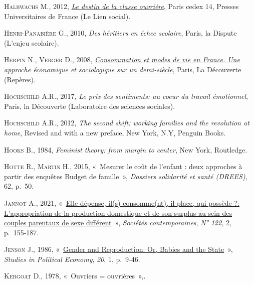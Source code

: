 \documentclass[
  12pt,
]{book}
\newlength{\cslhangindent}
\newenvironment{CSLReferences}[2] %
 {\begin{list}{}{%
  \setlength{\itemindent}{0pt}
  \setlength{\leftmargin}{0pt}
  \setlength{\parsep}{0pt}
  \ifodd #1
   \setlength{\leftmargin}{\cslhangindent}
   \setlength{\itemindent}{-1\cslhangindent}
  \fi
  \setlength{\itemsep}{#2\baselineskip}}}
 {\end{list}}
\begin{document}
\begin{CSLReferences}{0}{1}
\textsc{Halbwachs M.}, 2012,
\emph{\href{https://www.cairn.info/le-destin-de-la-classe-ouvriere--9782130585909.htm}{Le
destin de la classe ouvrière}}, Paris cedex 14, Presses Universitaires
de France (Le Lien social).

\textsc{Henri-Panabière G.}, 2010, \emph{Des héritiers en échec
scolaire}, Paris, la Dispute (L'enjeu scolaire).

\textsc{Herpin N.}, \textsc{Verger D.}, 2008,
\emph{\href{https://www.cairn.info/consommation-et-modes-de-vie-en-france--9782707156655.htm}{Consommation
et modes de vie en France. Une approche économique et sociologique sur
un demi-siècle}}, Paris, La Découverte (Repères).

\textsc{Hochschild A.R.}, 2017, \emph{Le prix des sentiments: au coeur
du travail émotionnel}, Paris, la Découverte (Laboratoire des sciences
sociales).

\textsc{Hochschild A.R.}, 2012, \emph{The second shift: working families
and the revolution at home}, Revised and with a new preface, New York,
N.Y, Penguin Books.

\textsc{Hooks B.}, 1984, \emph{Feminist theory: from margin to center},
New York, Routledge.

\textsc{Hotte R.}, \textsc{Martin H.}, 2015, {«~Mesurer le coût de
l{'}enfant : deux approches à partir des enquêtes Budget de famille~»},
\emph{Dossiers solidarité et santé (DREES)}, 62, p.~50.

\textsc{Jannot A.}, 2021,
{«~\href{https://doi.org/10.3917/soco.122.0155}{Elle dépense, il(s)
consomme(nt), il place, qui possède ?: L'appropriation de la production
domestique et de son surplus au sein des couples parentaux de sexe
différent}~»}, \emph{Sociétés contemporaines}, \emph{N° 122}, 2,
p.~155‑187.

\textsc{Jenson J.}, 1986,
{«~\href{https://doi.org/10.1080/19187033.1986.11675588}{Gender and
Reproduction: Or, Babies and the State}~»}, \emph{Studies in Political
Economy}, \emph{20}, 1, p.~9‑46.

\textsc{Kergoat D.}, 1978, {«~Ouvriers = ouvrières~»},.


\end{CSLReferences}
\end{document}
